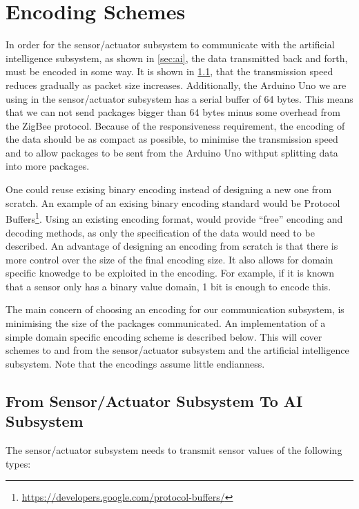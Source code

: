 \section{Encoding Schemes}

In order for the sensor/actuator subsystem to communicate with the artificial intelligence subsystem, as shown in \cref{sec:ai}, the data transmitted back and forth, must be encoded in some way. It is shown in \cref{}, that the transmission speed reduces gradually as packet size increases. Additionally, the Arduino Uno we are using in the sensor/actuator subsystem has a serial buffer of 64 bytes. This means that we can not send packages bigger than 64 bytes minus some overhead from the ZigBee protocol. Because of the responsiveness requirement, the encoding of the data should be as compact as possible, to minimise the transmission speed and to allow packages to be sent from the Arduino Uno withput splitting data into more packages.

One could reuse exising binary encoding instead of designing a new one from scratch. An example of an exising binary encoding standard would be Protocol Buffers\footnote{\url{https://developers.google.com/protocol-buffers/}}. Using an existing encoding format, would provide \enquote{free} encoding and decoding methods, as only the specification of the data would need to be described. An advantage of designing an encoding from scratch is that there is more control over the size of the final encoding size. It also allows for domain specific knowedge to be exploited in the encoding. For example, if it is known that a sensor only has a binary value domain, 1 bit is enough to encode this.

The main concern of choosing an encoding for our communication subsystem, is minimising the size of the packages communicated. An implementation of a simple domain specific encoding scheme is described below. This will cover schemes to and from the sensor/actuator subsystem and the artificial intelligence subsystem. Note that the encodings assume little endianness.

\subsection{From Sensor/Actuator Subsystem To AI Subsystem}
The sensor/actuator subsystem needs to transmit sensor values of the following types:

